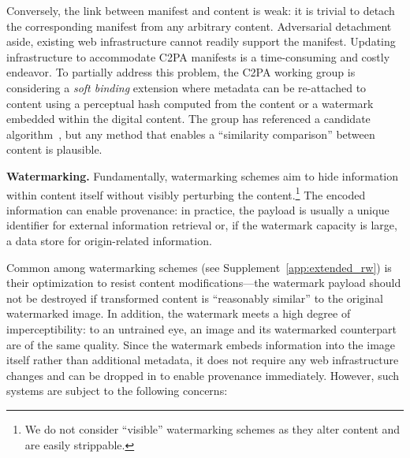 Conversely, the link between manifest and content is weak: it is trivial to detach the corresponding manifest from any arbitrary content.
Adversarial detachment aside, existing web infrastructure cannot readily support the manifest.
Updating infrastructure to accommodate C2PA manifests is a time-consuming and costly endeavor.
To partially address this problem, the C2PA working group is considering a \textit{soft binding} extension where metadata can be re-attached to content using a perceptual hash computed from the content or a watermark embedded within the digital content.
The group has referenced a candidate algorithm~\citep{iscc2024enhancement}, but any method that enables a ``similarity comparison'' between content is plausible.

\textbf{Watermarking.}
Fundamentally, watermarking schemes aim to hide information within content itself without visibly perturbing the content.\footnote{We do not consider ``visible'' watermarking schemes as they alter content and are easily strippable.}
The encoded information can enable provenance: in practice, the payload is usually a unique identifier for external information retrieval or, if the watermark capacity is large, a data store for origin-related information.

Common among watermarking schemes (see Supplement~\ref{app:extended_rw}) is their optimization to resist content modifications---the watermark payload should not be destroyed if transformed content is ``reasonably similar'' to the original watermarked image.
In addition, the watermark meets a high degree of imperceptibility: to an untrained eye, an image and its watermarked counterpart are of the same quality.
Since the watermark embeds information into the image itself rather than additional metadata, it does not require any web infrastructure changes and can be dropped in to enable provenance immediately.
However, such systems are subject to the following concerns:

